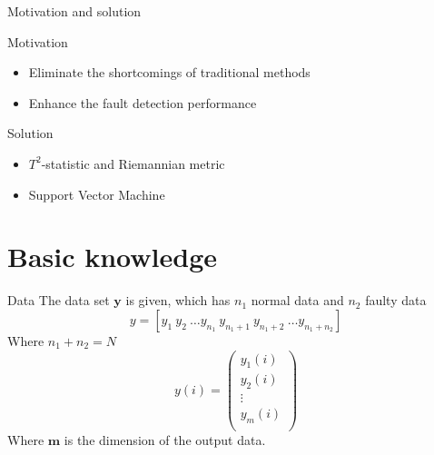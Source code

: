 \documentclass[10pt]{beamer}
\begin{document}
\begin{frame}{Motivation and solution}
\begin{exampleblock}{Motivation}
      \begin{itemize}
      \item Eliminate the shortcomings of traditional methods
      \item Enhance the fault detection performance
 	 \end{itemize}  
 	 \end{exampleblock}
 \begin{exampleblock}{Solution}
      \begin{itemize}
      \item $T^2$-statistic and Riemannian metric
      \item Support Vector Machine
 	 \end{itemize}  
 	 \end{exampleblock}

\end{frame}






\section{Basic knowledge}

\begin{frame}{Data}
The data set $\textbf{y}$ is given, which has $n_1$ normal data and $n_2$
faulty data
\begin{equation}
   y = [y_1 \ y_2 \ \dots y_{n_1} \ y_{n_1+1} \ y_{n_1+2} \ \dots y_{n_1+n_2}] 
\end{equation}
Where $n_1 + n_2 = N$
\begin{equation}
    y(i) = 
    \begin{pmatrix}
        y_1(i) \\
        y_2(i) \\
       \vdots  \\
        y_m(i) \\ 
    \end{pmatrix}
\end{equation}
Where $\textbf{m}$ is the dimension of the output data. %
\end{frame}
\end{document}
